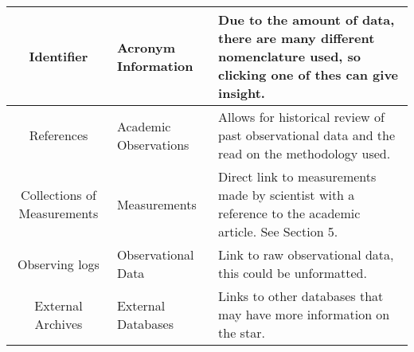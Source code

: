 \documentclass[12pt,oneside,a4paper,english]{article}
\begin{document}
\begin{table}[H]
\begin{tabular}{|c|p{3cm}|p{9cm}|}
            Identifier & Acronym Information & Due to the amount of data, there are many different nomenclature used, so clicking one of thes can give insight.  \\ \hline
            References & Academic Observations & Allows for historical review of past observational data and the read on the methodology used. \\ \hline
            Collections of Measurements & Measurements  & Direct link to measurements made by scientist with a reference to the academic article. See Section 5.  \\ \hline
            Observing logs & Observational Data & Link to raw observational data, this could be unformatted.  \\ \hline
            External Archives & External Databases & Links to other databases that may have more information on the star.  \\ \hline
    \end{tabular}
    \label{tab:table1}
\end{table}
\end{document}
